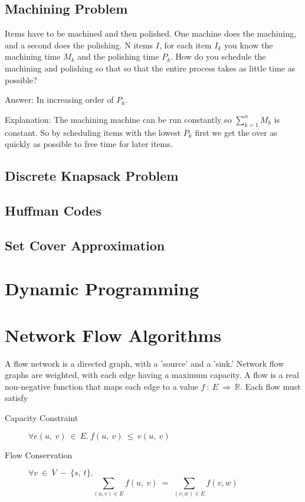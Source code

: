 \documentclass[a4paper]{article}
\begin{document}
\subsection{Machining Problem}
Items have to be machined and then polished. One machine does the machining, and a second does the polishing. N items $I$, for each item $I_k$ you know the machining time $M_k$ and the polishing time $P_k$. How do you schedule the machining and polishing so that so that the entire process takes as little time as possible?

Answer: In increasing order of $P_k$.

Explanation: The machining machine can be run constantly so $\sum\limits_{k=1}^{n} M_k$ is constant. So by scheduling items with the lowest $P_k$ first we get the over as quickly as possible to free time for later items.
\subsection{Discrete Knapsack Problem}
\subsection{Huffman Codes}
\subsection{Set Cover Approximation}

\section{Dynamic Programming}

\section{Network Flow Algorithms}
		 A flow network is a directed graph, with a 'source' and a 'sink.' Network flow graphs are weighted, with each edge having a maximum capacity. A flow is a real non-negative function that maps each edge to a value $f\ :\ E\ \Rightarrow\ \mathbb{R}$. Each flow must satisfy
		 \begin{description}
				 \item[Capacity Constraint] $\forall e(u,\ v)\ \in\ E.\ f(u,\ v)\ \leq\ e(u,\ v)$
				 \item[Flow Conservation] $\forall v\ \in\ V\ -\ \{s,\ t\}.\ $$$\sum_{(u, v) \in E} f(u,\ v)\ =\ \sum_{(v,w)\in E} f(v, w)$$
		 \end{description}
\end{document}
